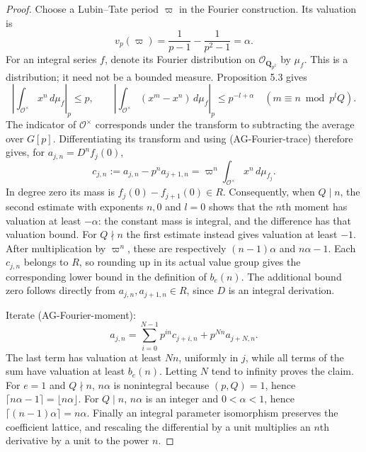 \documentclass[11pt,a4paper]{article}
\begin{document}
\begin{proof}
Choose a Lubin--Tate period $\varpi$ in the Fourier construction.  Its
valuation is
\[
 v_p(\varpi)=\frac1{p-1}-\frac1{p^2-1}=\alpha.
\]
For an integral series $f$, denote its Fourier distribution on
$\mathcal O_{\mathbf Q_{p^2}}$ by $\mu_f$.  This is a distribution;
it need not be a bounded measure.  Proposition 5.3 gives
\[
 \left|\int_{\mathcal O^\times}x^n\,d\mu_f\right|_p\leq p,
 \qquad
 \left|\int_{\mathcal O^\times}(x^m-x^n)\,d\mu_f\right|_p
       \leq p^{-l+\alpha}
 \quad(m\equiv n\bmod p^lQ).                              \tag{AG-Fourier-est}
\]
The indicator of $\mathcal O^\times$ corresponds under the transform to
subtracting the average over $G[p]$.  Differentiating its transform and
using (AG-Fourier-trace) therefore gives, for $a_{j,n}=D^nf_j(0)$,
\[
 c_{j,n}:=a_{j,n}-p^n a_{j+1,n}
       =\varpi^n\int_{\mathcal O^\times}x^n\,d\mu_{f_j}.    \tag{AG-Fourier-moment}
\]
In degree zero its mass is $f_j(0)-f_{j+1}(0)\in R$.  Consequently,
when $Q\mid n$, the second estimate with exponents $n,0$ and $l=0$
shows that the $n$th moment has valuation at least $-\alpha$:
the constant mass is integral, and the difference has that valuation
bound.  For $Q\nmid n$ the first estimate instead gives valuation
at least $-1$.  After multiplication by $\varpi^n$, these are respectively
$(n-1)\alpha$ and $n\alpha-1$.  Each $c_{j,n}$ belongs to $R$, so rounding
up in its actual value group gives the corresponding lower bound in the
definition of $b_e(n)$.  The additional bound zero follows directly from
$a_{j,n},a_{j+1,n}\in R$, since $D$ is an integral derivation.

Iterate (AG-Fourier-moment):
\[
 a_{j,n}=\sum_{i=0}^{N-1}p^{in}c_{j+i,n}+p^{Nn}a_{j+N,n}.
\]
The last term has valuation at least $Nn$, uniformly in $j$, while all
terms of the sum have valuation at least $b_e(n)$.  Letting $N$ tend to
infinity proves the claim.  For $e=1$ and $Q\nmid n$, $n\alpha$ is
nonintegral because $(p,Q)=1$, hence $\lceil n\alpha-1\rceil
=\lfloor n\alpha\rfloor$.  For $Q\mid n$, $n\alpha$ is an integer
and $0<\alpha<1$, hence $\lceil(n-1)\alpha\rceil=n\alpha$.
Finally an integral parameter isomorphism preserves the coefficient
lattice, and rescaling the differential by a unit multiplies an $n$th
derivative by a unit to the power $n$.
\end{proof}
\end{document}
